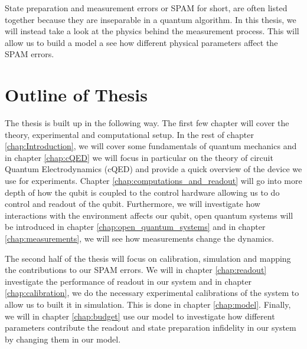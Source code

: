 State preparation and measurement errors or SPAM for short, are often listed together because they are inseparable in a quantum algorithm. In this thesis, we will instead take a look at the physics behind the measurement process. This will allow us to build a model a see how different physical parameters affect the SPAM errors. 





\section{Outline of Thesis}
The thesis is built up in the following way. The first few chapter will cover the theory, experimental and computational setup. In the rest of chapter \ref{chap:Introduction}, we will cover some fundamentals of quantum mechanics and in chapter \ref{chap:cQED} we will focus in particular on the theory of circuit Quantum Electrodynamics (cQED) and provide a quick overview of the device we use for experiments. Chapter \ref{chap:computations_and_readout} will go into more depth of how the qubit is coupled to the control hardware allowing us to do control and readout of the qubit. Furthermore, we will investigate how interactions with the environment affects our qubit, open quantum systems will be introduced in chapter \ref{chap:open_quantum_systems} and in chapter \ref{chap:measurements}, we will see how measurements change the dynamics.

The second half of the thesis will focus on calibration, simulation and mapping the contributions to our SPAM errors. We will in chapter \ref{chap:readout} investigate the performance of readout in our system and in chapter \ref{chap:calibration}, we do the necessary experimental calibrations of the system to allow us to built it in simulation. This is done in chapter \ref{chap:model}. Finally, we will in chapter \ref{chap:budget} use our model to investigate how different parameters contribute the readout and state preparation infidelity in our system by changing them in our model.  



